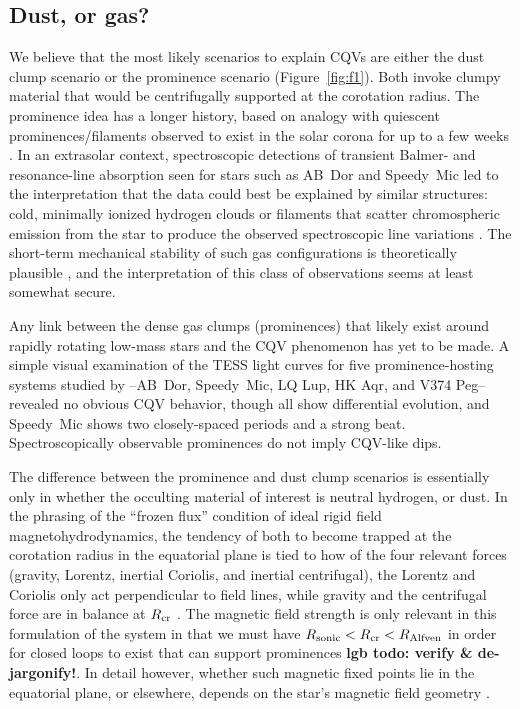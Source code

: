 \documentclass[11pt,twocolumn,tighten]{aastex63}
\begin{document}
\subsection{Dust, or gas?}
We believe that the most likely scenarios to explain CQVs
are either the dust clump scenario or the prominence scenario
(Figure~\ref{fig:f1}).  Both invoke clumpy material that would be
centrifugally supported at the corotation radius.  The prominence idea
has a longer history, based on analogy with quiescent
prominences/filaments observed to exist in the solar corona for up to
a few weeks \citep[see][]{2015ASSL..415.....V}.  In an extrasolar
context, spectroscopic detections of transient Balmer- and
resonance-line absorption seen for stars such as AB~Dor and Speedy~Mic
\citep[e.g.][]{1989MNRAS.238..657C,1993MNRAS.262..369J,2006MNRAS.365..530D,2016MNRAS.463..965L}
led to the interpretation that the data could best be explained by
similar structures: cold, minimally ionized hydrogen clouds
or filaments that scatter chromospheric emission from the star to
produce the observed spectroscopic line variations
\citep[see][]{1989MNRAS.238..657C}.  The short-term mechanical
stability of such gas configurations is theoretically plausible
\citep{2000MNRAS.316..647F,2022MNRAS.514.5465W}, and the
interpretation of this class of observations seems at least somewhat
secure.

Any link between the dense gas clumps (prominences) that likely exist
around rapidly rotating low-mass stars and the CQV phenomenon has
yet to be made.  A simple visual examination of the TESS light curves
for five prominence-hosting systems studied by
\citet{2019MNRAS.482.2853J}--AB~Dor, Speedy~Mic, LQ Lup, HK Aqr, and
V374 Peg--revealed no obvious CQV behavior, though all show
differential evolution, and Speedy~Mic shows two closely-spaced periods
and a strong beat.  Spectroscopically observable prominences 
do not imply CQV-like dips.

The difference between the prominence and dust clump scenarios is
essentially only in whether the occulting material of interest is
neutral hydrogen, or dust.  In the phrasing of the ``frozen flux''
condition of ideal rigid field magnetohydrodynamics, the tendency of
both to become trapped at the corotation radius in the equatorial
plane is tied to how of the four relevant forces (gravity, Lorentz,
inertial Coriolis, and inertial centrifugal), the Lorentz and Coriolis
only act perpendicular to field lines, while gravity and the
centrifugal force are in balance at $R_{\rm cr}$
\citep[see][Sec.~2]{2005MNRAS.357..251T}.  The magnetic field strength
is only relevant in this formulation of the system in that we must
have $R_{\rm sonic} < R_{\rm cr} < R_{\rm Alfven}$ in order for closed
loops to exist that can support prominences
\citep{2019MNRAS.482.2853J} {\bf lgb todo: verify \& de-jargonify!}.
In detail however, whether such magnetic fixed points lie in the
equatorial plane, or elsewhere, depends on the star's magnetic field
geometry \citep{2023MNRAS.518.4734S}.
\end{document}
